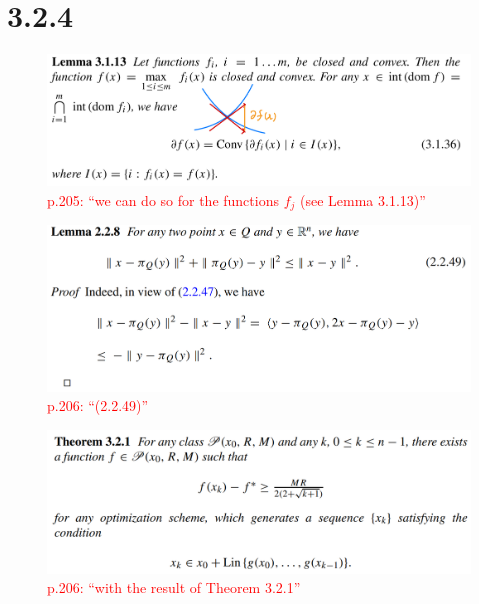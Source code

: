 \documentclass[a4paper, 14pt, dvipdfmx]{extarticle}
\newcommand{\red}[1]{\textcolor{red}{#1}}
\begin{document}
\section*{3.2.4}

\begin{figure}[H]
    \centering
    \includegraphics[width=\columnwidth]{lem3113.png}
    \caption{\red{p.205: ``we can do so for the functions $f_j$ (see Lemma 3.1.13)''}}
\end{figure}

\begin{figure}[H]
    \centering
    \includegraphics[width=\columnwidth]{lem228.png}
    \caption{\red{p.206: ``(2.2.49)''}}
\end{figure}

\begin{figure}[H]
    \centering
    \includegraphics[width=\columnwidth]{thm321.png}
    \caption{\red{p.206: ``with the result of Theorem 3.2.1''}}
\end{figure}
\end{document}
